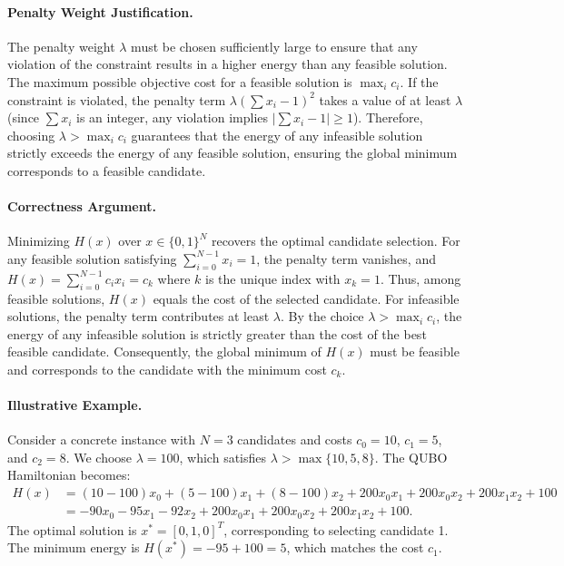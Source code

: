 \documentclass[12pt]{article}
\begin{document}
\paragraph{Penalty Weight Justification.}
The penalty weight $\lambda$ must be chosen sufficiently large to ensure that any violation of the constraint results in a higher energy than any feasible solution. The maximum possible objective cost for a feasible solution is $\max_{i} c_i$. If the constraint is violated, the penalty term $\lambda (\sum x_i - 1)^2$ takes a value of at least $\lambda$ (since $\sum x_i$ is an integer, any violation implies $|\sum x_i - 1| \ge 1$). Therefore, choosing $\lambda > \max_{i} c_i$ guarantees that the energy of any infeasible solution strictly exceeds the energy of any feasible solution, ensuring the global minimum corresponds to a feasible candidate.

\paragraph{Correctness Argument.}
Minimizing $H(x)$ over $x \in \{0,1\}^N$ recovers the optimal candidate selection. For any feasible solution satisfying $\sum_{i=0}^{N-1} x_i = 1$, the penalty term vanishes, and $H(x) = \sum_{i=0}^{N-1} c_i x_i = c_k$ where $k$ is the unique index with $x_k=1$. Thus, among feasible solutions, $H(x)$ equals the cost of the selected candidate. For infeasible solutions, the penalty term contributes at least $\lambda$. By the choice $\lambda > \max_i c_i$, the energy of any infeasible solution is strictly greater than the cost of the best feasible candidate. Consequently, the global minimum of $H(x)$ must be feasible and corresponds to the candidate with the minimum cost $c_k$.

\paragraph{Illustrative Example.}
Consider a concrete instance with $N=3$ candidates and costs $c_0 = 10$, $c_1 = 5$, and $c_2 = 8$. We choose $\lambda = 100$, which satisfies $\lambda > \max\{10, 5, 8\}$.
The QUBO Hamiltonian becomes:
\begin{align}
    H(x) &= (10 - 100)x_0 + (5 - 100)x_1 + (8 - 100)x_2 + 200 x_0 x_1 + 200 x_0 x_2 + 200 x_1 x_2 + 100 \nonumber \\
    &= -90 x_0 - 95 x_1 - 92 x_2 + 200 x_0 x_1 + 200 x_0 x_2 + 200 x_1 x_2 + 100.
\end{align}
The optimal solution is $x^* = [0, 1, 0]^T$, corresponding to selecting candidate 1. The minimum energy is $H(x^*) = -95 + 100 = 5$, which matches the cost $c_1$.
\end{document}
